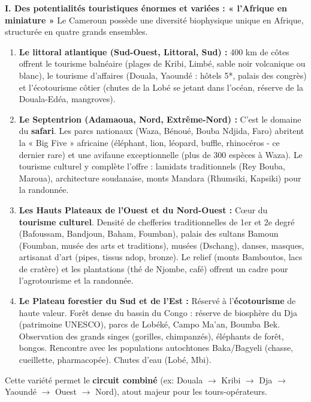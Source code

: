\documentclass[11pt]{article}
\begin{document}
\begin{corrige}
\textbf{I. Des potentialités touristiques énormes et variées : « l'Afrique en miniature »}
Le Cameroun possède une diversité biophysique unique en Afrique, structurée en quatre grands ensembles.
\begin{enumerate}
\item \textbf{Le littoral atlantique (Sud-Ouest, Littoral, Sud) :} 400 km de côtes offrent le tourisme balnéaire (plages de Kribi, Limbé, sable noir volcanique ou blanc), le tourisme d'affaires (Douala, Yaoundé : hôtels 5*, palais des congrès) et l'écotourisme côtier (chutes de la Lobé se jetant dans l'océan, réserve de la Douala-Edéa, mangroves).
\item \textbf{Le Septentrion (Adamaoua, Nord, Extrême-Nord) :} C'est le domaine du \textbf{safari}. Les parcs nationaux (Waza, Bénoué, Bouba Ndjida, Faro) abritent la « Big Five » africaine (éléphant, lion, léopard, buffle, rhinocéros - ce dernier rare) et une avifaune exceptionnelle (plus de 300 espèces à Waza). Le tourisme culturel y complète l'offre : lamidats traditionnels (Rey Bouba, Maroua), architecture soudanaise, monts Mandara (Rhumsiki, Kapsiki) pour la randonnée.
\item \textbf{Les Hauts Plateaux de l'Ouest et du Nord-Ouest :} Cœur du \textbf{tourisme culturel}. Densité de chefferies traditionnelles de 1er et 2e degré (Bafoussam, Bandjoun, Baham, Foumban), palais des sultans Bamoun (Foumban, musée des arts et traditions), musées (Dschang), danses, masques, artisanat d'art (pipes, tissus ndop, bronze). Le relief (monts Bamboutos, lacs de cratère) et les plantations (thé de Njombe, café) offrent un cadre pour l'agrotourisme et la randonnée.
\item \textbf{Le Plateau forestier du Sud et de l'Est :} Réservé à l'\textbf{écotourisme} de haute valeur. Forêt dense du bassin du Congo : réserve de biosphère du Dja (patrimoine UNESCO), parcs de Lobéké, Campo Ma'an, Boumba Bek. Observation des grands singes (gorilles, chimpanzés), éléphants de forêt, bongos. Rencontre avec les populations autochtones Baka/Bagyeli (chasse, cueillette, pharmacopée). Chutes d'eau (Lobé, Mbi).
\end{enumerate}
Cette variété permet le \textbf{circuit combiné} (ex: Douala $\to$ Kribi $\to$ Dja $\to$ Yaoundé $\to$ Ouest $\to$ Nord), atout majeur pour les tours-opérateurs.


\end{corrige}
\end{document}
